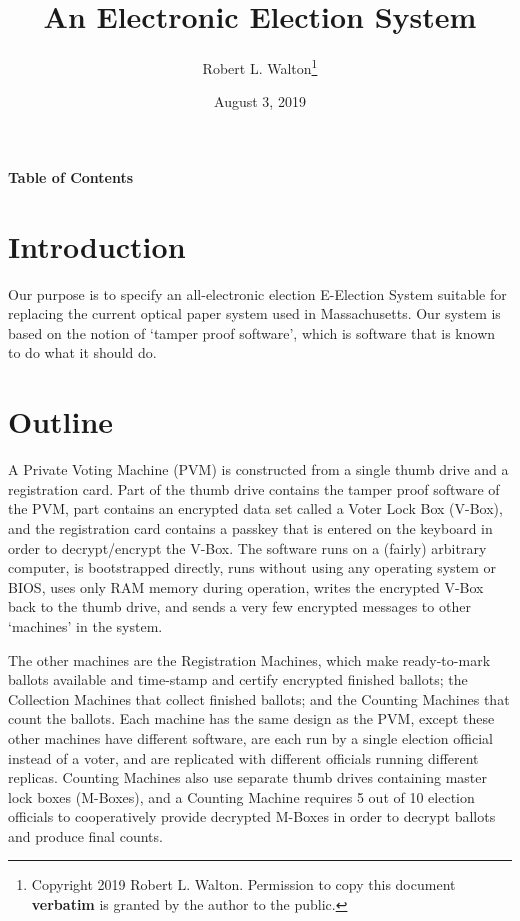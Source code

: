 \documentclass[12pt]{article}
\makeatletter
\renewcommand\tableofcontents{%
    \begin{list}{}%
	     {\setlength{\itemsep}{0in}%
	      \setlength{\topsep}{0in}%
	      \setlength{\parsep}{1ex}%
	      \setlength{\labelwidth}{0in}%
	      \setlength{\baselineskip}{1.5ex}%
	      \setlength{\leftmargin}{0.8in}%
	      \setlength{\rightmargin}{0.8in}}%
    \item\@starttoc{toc}%
    \end{list}}
\makeatother
\begin{document}
        
\title{An Electronic Election System}

\author{Robert L. Walton\thanks{Copyright 2019 Robert L. Walton.
Permission to copy this document {\bf verbatim} is granted by the author
to the public.}}

\date{August 3, 2019}

\maketitle

\begin{center}
\large \bf Table of Contents
\end{center}

\bigskip

\tableofcontents 

\newpage

\section{Introduction}

Our purpose is to specify an all-electronic election E-Election System
suitable for replacing the current optical paper system
used in Massachusetts.  Our system is based on the notion
of `tamper proof software', which is software that is
known to do what it should do.

\section{Outline}

A Private Voting Machine
(PVM) is constructed from a single thumb drive and a
registration card.  Part of the thumb drive contains the
tamper proof software of the PVM, part contains an encrypted
data set called a Voter Lock Box (V-Box), and the registration
card contains a passkey that is entered on the keyboard in
order to decrypt/encrypt the V-Box.  The software runs on
a (fairly) arbitrary computer, is bootstrapped directly,
runs without using any operating system or BIOS,
uses only RAM memory during operation,
writes the encrypted V-Box back to the thumb drive, and sends
a very few encrypted messages to other `machines' in the
system.

The other machines are the Registration Machines, which make
ready-to-mark ballots available and time-stamp and certify
encrypted finished ballots; the Collection Machines that collect
finished ballots; and the Counting Machines that count the
ballots.  Each machine has the same design as the PVM, except
these other machines have different software,
are each run by a single election official instead of a voter, and
are replicated with different officials running different
replicas.  Counting Machines also use separate
thumb drives containing master lock boxes
(M-Boxes), and a Counting Machine requires
5 out of 10 election officials to cooperatively
provide decrypted M-Boxes in order to decrypt ballots and
produce final counts.
\end{document}
